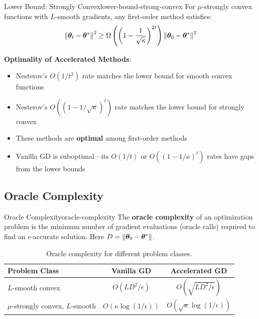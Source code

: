 \documentclass[../../main.tex]{subfiles}
\begin{document}
\begin{theorem}{Lower Bound: Strongly Convex}{lower-bound-strong-convex}
For $\mu$-strongly convex functions with $L$-smooth gradients, any first-order method satisfies:
\[
    \left\lVert \boldsymbol{\theta}_t - \boldsymbol{\theta}^* \right\rVert^2 \geq \Omega\left(\left(1 - \frac{1}{\sqrt{\kappa}}\right)^{2t}\right) \left\lVert \boldsymbol{\theta}_0 - \boldsymbol{\theta}^* \right\rVert^2
\]
\end{theorem}

\begin{keyconcept}
\textbf{Optimality of Accelerated Methods}:
\begin{itemize}
    \item Nesterov's $O(1/t^2)$ rate matches the lower bound for smooth convex functions
    \item Nesterov's $O((1-1/\sqrt{\kappa})^t)$ rate matches the lower bound for strongly convex
    \item These methods are \textbf{optimal} among first-order methods
    \item Vanilla GD is suboptimal---its $O(1/t)$ or $O((1-1/\kappa)^t)$ rates have gaps from the lower bounds
\end{itemize}
\end{keyconcept}

\subsection{Oracle Complexity}

\begin{definition}{Oracle Complexity}{oracle-complexity}
The \textbf{oracle complexity} of an optimization problem is the minimum number of gradient evaluations (oracle calls) required to find an $\epsilon$-accurate solution. Here $D = \left\lVert \boldsymbol{\theta}_0 - \boldsymbol{\theta}^* \right\rVert$.
\end{definition}

\begin{table}[htbp]
\centering
\caption{Oracle complexity for different problem classes.}
\label{tab:oracle-complexity}
\begin{tabular}{@{}lcc@{}}
\toprule
\textbf{Problem Class} & \textbf{Vanilla GD} & \textbf{Accelerated GD} \\
\midrule
$L$-smooth convex & $O(L D^2/\epsilon)$ & $O(\sqrt{L D^2/\epsilon})$ \\
$\mu$-strongly convex, $L$-smooth & $O(\kappa \log(1/\epsilon))$ & $O(\sqrt{\kappa} \log(1/\epsilon))$ \\
\bottomrule
\end{tabular}
\end{table}
\end{document}
